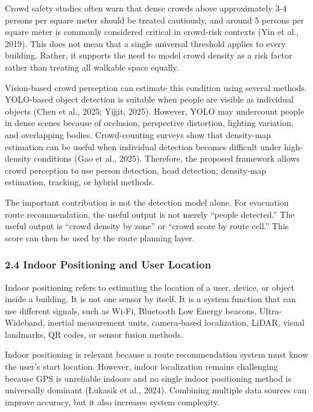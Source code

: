 \documentclass[
]{article}
\begin{document}
Crowd safety studies often warn that dense crowds above approximately
3-4 persons per square meter should be treated cautiously, and around 5
persons per square meter is commonly considered critical in crowd-risk
contexts (Yin et al., 2019). This does not mean that a single universal
threshold applies to every building. Rather, it supports the need to
model crowd density as a risk factor rather than treating all walkable
space equally.

Vision-based crowd perception can estimate this condition using several
methods. YOLO-based object detection is suitable when people are visible
as individual objects (Chen et al., 2025; Yiğit, 2025). However, YOLO
may undercount people in dense scenes because of occlusion, perspective
distortion, lighting variation, and overlapping bodies. Crowd-counting
surveys show that density-map estimation can be useful when individual
detection becomes difficult under high-density conditions (Gao et al.,
2025). Therefore, the proposed framework allows crowd perception to use
person detection, head detection, density-map estimation, tracking, or
hybrid methods.

The important contribution is not the detection model alone. For
evacuation route recommendation, the useful output is not merely
``people detected.'' The useful output is ``crowd density by zone'' or
``crowd score by route cell.'' This score can then be used by the route
planning layer.

\subsubsection{2.4 Indoor Positioning and User
Location}\label{indoor-positioning-and-user-location}

Indoor positioning refers to estimating the location of a user, device,
or object inside a building. It is not one sensor by itself. It is a
system function that can use different signals, such as Wi-Fi, Bluetooth
Low Energy beacons, Ultra-Wideband, inertial measurement units,
camera-based localization, LiDAR, visual landmarks, QR codes, or sensor
fusion methods.

Indoor positioning is relevant because a route recommendation system
must know the user's start location. However, indoor localization
remains challenging because GPS is unreliable indoors and no single
indoor positioning method is universally dominant (Łukasik et al.,
2024). Combining multiple data sources can improve accuracy, but it also
increases system complexity.
\end{document}

